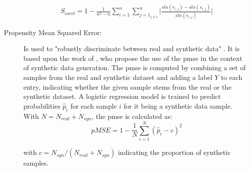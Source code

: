 \begin{description}
  \begin{equation}
    \begin{align}
      \label{eqn:s_corrl}
      S_{corrl} = 1-\frac{1}{n^2-n} \sum_{i=1}^{n}\sum_{j=1_{j \neq i}}^{n} \bigg| \frac{sln(r_{i,j})- sln(s_{i,j})}{sln(r_{i,j})}\bigg| 
      \end{align}
  \end{equation}

  \item[Propensity Mean Squared Error:]
  Is used to "robustly discriminate between real and synthetic data" \cite[p. 3]{chundawat2022UniversalMetricRobust}.
  It is based upon the work of \textcite{snoke2018GeneralSpecificUtility}, who propose the use of the \gls{pmse} in the context of synthetic data generation.
  The \gls{pmse} is computed by combining a set of samples from the real and synthetic dataset and adding a label $Y$ to each entry, 
  indicating whether the given sample stems from the real or the synthetic dataset.
  A logistic regression \gls{model} is trained to predict probabilities $\hat{p}_i$ for each sample $i$ for it being a synthetic data sample.
  With $N=N_{real}+N_{syn}$, the \gls{pmse} is calculated as:
  $$pMSE = 1-\frac{1}{N} \sum_{i=1}^{N}(\hat{p}_i-c)^2$$

  with $c=N_{syn}/(N_{real}+N_{syn})$ indicating the proportion of synthetic samples.
  

\end{description}
